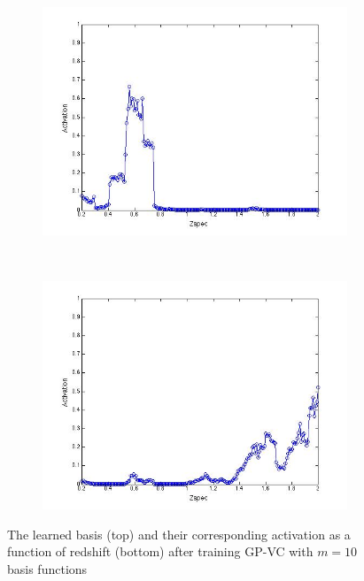 \documentclass[useAMS,usenatbib,fleqn]{mn2e}
\begin{document}
\begin{figure}
\begin{subfigure}[b]{0.075\textwidth}
                \includegraphics[trim = 35px 15px 50px 25px, clip=true,width=\textwidth]{activation_09.jpg}
        \end{subfigure}
        ~
        \begin{subfigure}[b]{0.075\textwidth}
                \includegraphics[trim = 35px 15px 50px 25px, clip=true,width=\textwidth]{activation_10.jpg}
        \end{subfigure}
        
        
       \caption{The learned basis (top) and their corresponding activation as a function of redshift (bottom) after training GP-VC with $m=10$ basis functions}
	\label{fig-kernel-activations}
\end{figure}
\end{document}
